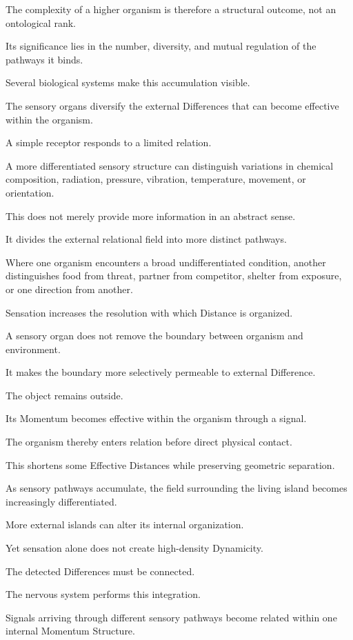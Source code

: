 The complexity of a higher organism is therefore a structural outcome, not an ontological rank.

Its significance lies in the number, diversity, and mutual regulation of the pathways it binds.

Several biological systems make this accumulation visible.

The sensory organs diversify the external Differences that can become effective within the organism.

A simple receptor responds to a limited relation.

A more differentiated sensory structure can distinguish variations in chemical composition, radiation, pressure, vibration, temperature, movement, or orientation.

This does not merely provide more information in an abstract sense.

It divides the external relational field into more distinct pathways.

Where one organism encounters a broad undifferentiated condition, another distinguishes food from threat, partner from competitor, shelter from exposure, or one direction from another.

Sensation increases the resolution with which Distance is organized.

A sensory organ does not remove the boundary between organism and environment.

It makes the boundary more selectively permeable to external Difference.

The object remains outside.

Its Momentum becomes effective within the organism through a signal.

The organism thereby enters relation before direct physical contact.

This shortens some Effective Distances while preserving geometric separation.

As sensory pathways accumulate, the field surrounding the living island becomes increasingly differentiated.

More external islands can alter its internal organization.

Yet sensation alone does not create high-density Dynamicity.

The detected Differences must be connected.

The nervous system performs this integration.

Signals arriving through different sensory pathways become related within one internal Momentum Structure.

